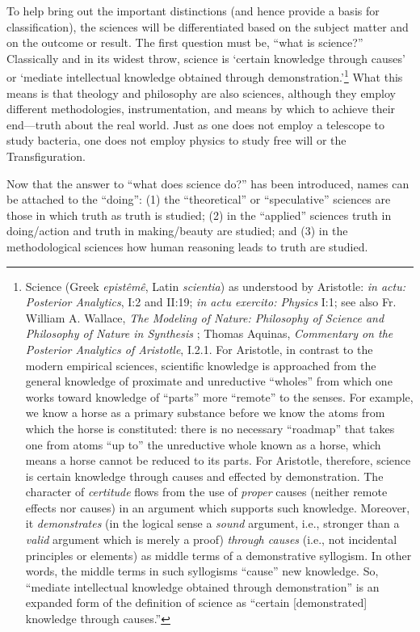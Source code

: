 To help bring out the important distinctions (and hence provide a basis for classification), the sciences will be differentiated based on the subject matter and on the outcome or result. The first question must be, ``what is science?'' Classically and in its widest throw, science is `certain knowledge through causes' or `mediate intellectual knowledge obtained through demonstration.'\footnote{
Science (Greek \textit{epistêmê}, Latin \textit{scientia}) as understood by Aristotle: \textit{in actu: Posterior Analytics}, I:2 and II:19; \textit{in actu exercito: Physics} I:1; see also Fr. William A. Wallace, \textit{The Modeling of Nature: Philosophy of Science and Philosophy of Nature in Synthesis} \citep[][p.~231]{wallace1997}; Thomas Aquinas, \textit{Commentary on the Posterior Analytics of Aristotle}, I.2.1. For Aristotle, in contrast to the modern empirical sciences, scientific knowledge is approached from the general knowledge of proximate and unreductive “wholes” from which one works toward knowledge of “parts” more “remote” to the senses. For example, we know a horse as a primary substance before we know the atoms from which the horse is constituted: there is no necessary “roadmap” that takes one from atoms “up to” the unreductive whole known as a horse, which means a horse cannot be reduced to its parts. For Aristotle, therefore, science is certain knowledge through causes and effected by demonstration. The character of \textit{certitude} flows from the use of \textit{proper} causes (neither remote effects nor causes) in an argument which supports such knowledge. Moreover, it \textit{demonstrates} (in the logical sense a \textit{sound} argument, i.e., stronger than a \textit{valid} argument which is merely a proof) \textit{through causes} (i.e., not incidental principles or elements) as middle terms of a demonstrative syllogism. In other words, the middle terms in such syllogisms “cause” new knowledge. So, “mediate intellectual knowledge obtained through demonstration” is an expanded form of the definition of science as “certain [demonstrated] knowledge through causes.”
} What this means is that theology and philosophy are also sciences, although they employ different methodologies, instrumentation, and means by which to achieve their end---truth about the real world. Just as one does not employ a telescope to study bacteria, one does not employ physics to study free will or the Transfiguration.

Now that the answer to ``what does science do?'' has been introduced, names can be attached to the ``doing'': (1) the ``theoretical'' or ``speculative'' sciences are those in which truth as truth is studied; (2) in the ``applied'' sciences truth in doing/action and truth in making/beauty are studied; and (3) in the methodological sciences how human reasoning leads to truth are studied.

